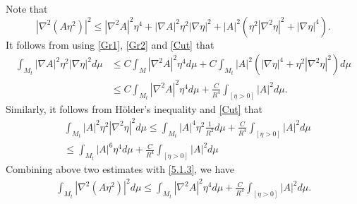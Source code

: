 \documentclass{amsart}
\theoremstyle{definition}
\numberwithin{equation}{section}
\begin{document}
  Note that
\[|\nabla^2(A\eta^2 )|^2\leq |\nabla^2 A|^2\eta^4 + |\nabla A|^2  \eta^2|\nabla \eta|^2  + |A|^2 (\eta^2|\nabla^2 \eta|^2 +|\nabla\eta |^4).
\]
It follows from using \eqref{Gr1}, \eqref{Gr2} and \eqref{Cut} that
\begin{align*}
       \int_{M_t}   |   \nabla  A|^2  \eta^2 |\nabla \eta|^2  d\mu
        &\leq    C\int_{M}|\nabla^2 A|^{2} \eta^4  d\mu
        + C \int_{M_t} |A|^2 (|\nabla
        \eta|^4+\eta^2|\nabla^2 \eta|^2)
       d\mu  \nonumber\\
       &\leq  C\int_{M_t }|\nabla^2 A|^{2} \eta^4  d\mu+ \frac C{R^4}\int_{\left[ \eta>0\right]} \left| A \right|^{2} d\mu.
\end{align*}
Similarly, it follows from H\"older's inequality and \eqref{Cut} that
\begin{align*}
       &\int_{M_t}  |A|^2 \eta^2|\nabla^2 \eta|^2 d\mu\leq  \int_{M_t}  |A|^4 \eta^2\frac 1{R^2}d\mu+ \frac C{R^4}\int_{\left[ \eta>0\right]}
       \left| A \right|^{2} d\mu \\
       &\leq  \int_{M_t}  |A|^6 \eta^4 d\mu + \frac C{R^4}\int_{\left[ \eta>0\right]} \left| A \right|^{2} d\mu
       \end{align*}
       Combining above two estimates with \eqref{5.1.3}, we have
       \begin{align}\label{4.12}
       \int_{M_t}|\nabla^2(A\eta^2 )|^2  d\mu\leq  \int_{M_t}  |\nabla^2 A|^{2} \eta^4 d\mu + \frac C{R^4}\int_{\left[ \eta>0\right]} \left| A
       \right|^{2} d\mu.
       \end{align}
\end{document}
